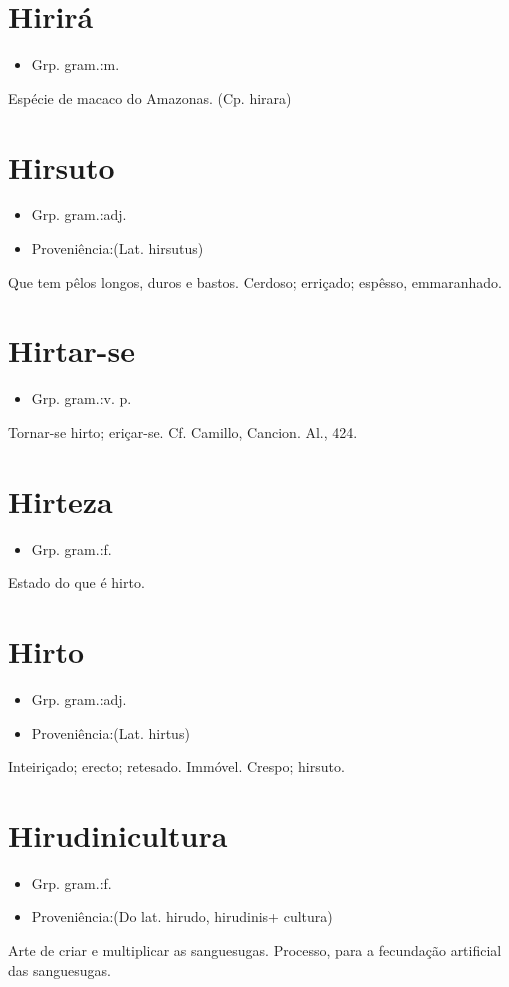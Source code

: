 \documentclass{article}
\begin{document}
\section{Hirirá}
\begin{itemize}
\item {Grp. gram.:m.}
\end{itemize}
Espécie de macaco do Amazonas.
(Cp. \textunderscore hirara\textunderscore )
\section{Hirsuto}
\begin{itemize}
\item {Grp. gram.:adj.}
\end{itemize}
\begin{itemize}
\item {Proveniência:(Lat. \textunderscore hirsutus\textunderscore )}
\end{itemize}
Que tem pêlos longos, duros e bastos.
Cerdoso; erriçado; espêsso, emmaranhado.
\section{Hirtar-se}
\begin{itemize}
\item {Grp. gram.:v. p.}
\end{itemize}
Tornar-se hirto; eriçar-se. Cf. Camillo, \textunderscore Cancion. Al.\textunderscore , 424.
\section{Hirteza}
\begin{itemize}
\item {Grp. gram.:f.}
\end{itemize}
Estado do que é hirto.
\section{Hirto}
\begin{itemize}
\item {Grp. gram.:adj.}
\end{itemize}
\begin{itemize}
\item {Proveniência:(Lat. \textunderscore hirtus\textunderscore )}
\end{itemize}
Inteiriçado; erecto; retesado.
Immóvel.
Crespo; hirsuto.
\section{Hirudinicultura}
\begin{itemize}
\item {Grp. gram.:f.}
\end{itemize}
\begin{itemize}
\item {Proveniência:(Do lat. \textunderscore hirudo\textunderscore , \textunderscore hirudinis\textunderscore  + \textunderscore cultura\textunderscore )}
\end{itemize}
Arte de criar e multiplicar as sanguesugas.
Processo, para a fecundação artificial das sanguesugas.
\end{document}
